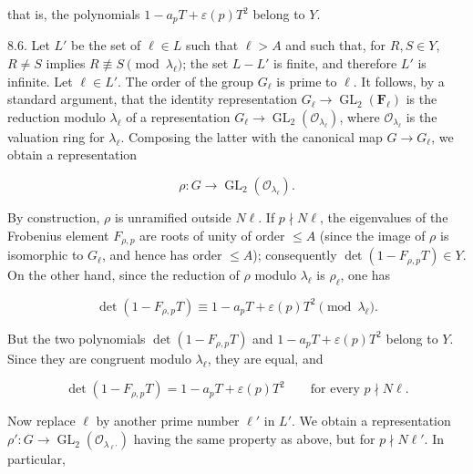 \documentclass[10pt,oneside]{article}
\begin{document}
that is, the polynomials \(1-a_pT+\varepsilon(p)T^2\) belong to \(Y\).\par

8.6. Let \(L'\) be the set of \(\ell\in L\) such that \(\ell>A\) and such that, for \(R,S\in Y\), \(R\neq S\) implies \(R\not\equiv S\pmod{\lambda_\ell}\); the set \(L-L'\) is finite, and therefore \(L'\) is infinite. Let \(\ell\in L'\). The order of the group \(G_\ell\) is prime to \(\ell\). It follows, by a standard argument, that the identity representation \(G_\ell\longrightarrow\operatorname{GL}_2(\mathbf{F}_\ell)\) is the reduction modulo \(\lambda_\ell\) of a representation \(G_\ell\longrightarrow\operatorname{GL}_2(\mathcal O_{\lambda_\ell})\), where \(\mathcal O_{\lambda_\ell}\) is the valuation ring for \(\lambda_\ell\). Composing the latter with the canonical map \(G\longrightarrow G_\ell\), we obtain a representation\par

\begin{equation*}
\rho:G\longrightarrow\operatorname{GL}_2(\mathcal O_{\lambda_\ell}).
\end{equation*}

By construction, \(\rho\) is unramified outside \(N\ell\). If \(p\nmid N\ell\), the eigenvalues of the Frobenius element \(F_{\rho,p}\) are roots of unity of order \(\leq A\) (since the image of \(\rho\) is isomorphic to \(G_\ell\), and hence has order \(\leq A\)); consequently \(\det(1-F_{\rho,p}T)\in Y\). On the other hand, since the reduction of \(\rho\) modulo \(\lambda_\ell\) is \(\rho_\ell\), one has\par

\begin{equation*}
\det(1-F_{\rho,p}T)\equiv1-a_pT+\varepsilon(p)T^2\pmod{\lambda_\ell}.
\end{equation*}

But the two polynomials \(\det(1-F_{\rho,p}T)\) and \(1-a_pT+\varepsilon(p)T^2\) belong to \(Y\). Since they are congruent modulo \(\lambda_\ell\), they are equal, and\par

\begin{equation*}
\det(1-F_{\rho,p}T)=1-a_pT+\varepsilon(p)T^2
\qquad\text{for every }p\nmid N\ell.
\end{equation*}

Now replace \(\ell\) by another prime number \(\ell'\) in \(L'\). We obtain a representation \(\rho':G\longrightarrow\operatorname{GL}_2(\mathcal O_{\lambda_{\ell'}})\) having the same property as above, but for \(p\nmid N\ell'\). In particular,\par
\end{document}
